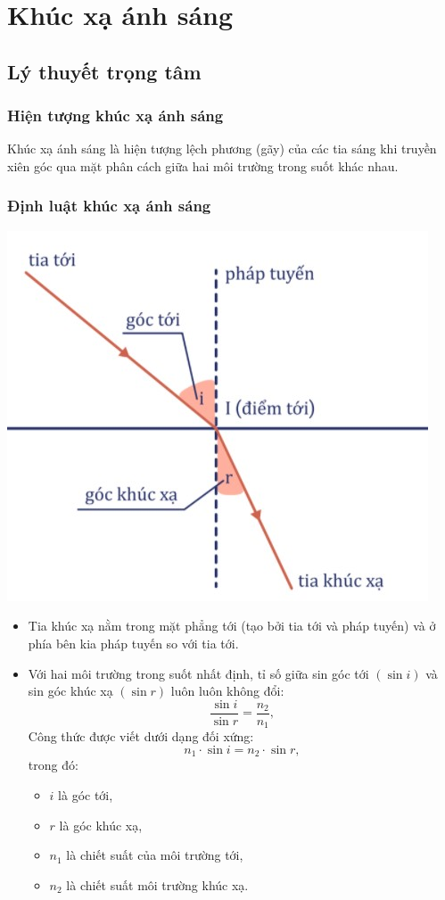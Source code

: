 \chapter{Khúc xạ ánh sáng}
\section{Lý thuyết trọng tâm}
\subsection{Hiện tượng khúc xạ ánh sáng}
Khúc xạ ánh sáng là hiện tượng lệch phương (gãy) của các tia sáng khi truyền xiên góc qua mặt phân cách giữa hai môi trường trong suốt khác nhau.
\subsection{Định luật khúc xạ ánh sáng}
\begin{center}
	\includegraphics[scale=0.8]{../figs/VN11-PH-34-L-023-1-h57.jpg}
\end{center}
\begin{itemize}
	\item Tia khúc xạ nằm trong mặt phẳng tới (tạo bởi tia tới và pháp tuyến) và ở phía bên kia pháp tuyến so với tia tới.
	\item Với hai môi trường trong suốt nhất định, tỉ số giữa sin góc tới $(\sin i)$ và sin góc khúc xạ $(\sin r)$ luôn luôn không đổi: 
	\begin{equation}
	\dfrac{\sin i}{\sin r}=\dfrac{n_2}{n_1},
	\end{equation}
	Công thức được viết dưới dạng đối xứng: 
	\begin{equation}
	n_1\cdot \sin i=n_2\cdot \sin r,
	\end{equation}
	trong đó:
	\begin{itemize}
		\item $i$ là góc tới,
		\item $r$ là góc khúc xạ,
		\item $n_1$ là chiết suất của môi trường tới,
		\item $n_2$ là chiết suất môi trường khúc xạ. 
	\end{itemize}
\end{itemize}
